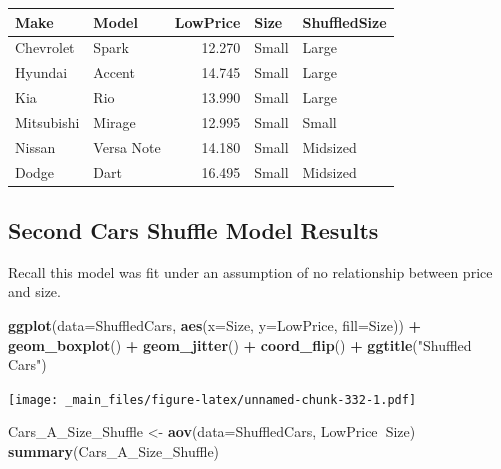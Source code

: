 \documentclass[]{book}
\newenvironment{Shaded}{\begin{snugshade}}{\end{snugshade}}
\newcommand{\KeywordTok}[1]{\textcolor[rgb]{0.13,0.29,0.53}{\textbf{#1}}}
\newcommand{\DataTypeTok}[1]{\textcolor[rgb]{0.13,0.29,0.53}{#1}}
\newcommand{\StringTok}[1]{\textcolor[rgb]{0.31,0.60,0.02}{#1}}
\newcommand{\OperatorTok}[1]{\textcolor[rgb]{0.81,0.36,0.00}{\textbf{#1}}}
\newcommand{\NormalTok}[1]{#1}
\begin{document}
\begin{tabular}{l|l|r|l|l}
\hline
Make & Model & LowPrice & Size & ShuffledSize\\
\hline
Chevrolet & Spark & 12.270 & Small & Large\\
\hline
Hyundai & Accent & 14.745 & Small & Large\\
\hline
Kia & Rio & 13.990 & Small & Large\\
\hline
Mitsubishi & Mirage & 12.995 & Small & Small\\
\hline
Nissan & Versa Note & 14.180 & Small & Midsized\\
\hline
Dodge & Dart & 16.495 & Small & Midsized\\
\hline
\end{tabular}

\subsection{Second Cars Shuffle Model
Results}\label{second-cars-shuffle-model-results-1}

Recall this model was fit under an assumption of no relationship between
price and size.

\begin{Shaded}
\begin{Highlighting}[]
\KeywordTok{ggplot}\NormalTok{(}\DataTypeTok{data=}\NormalTok{ShuffledCars, }\KeywordTok{aes}\NormalTok{(}\DataTypeTok{x=}\NormalTok{Size, }\DataTypeTok{y=}\NormalTok{LowPrice, }\DataTypeTok{fill=}\NormalTok{Size)) }\OperatorTok{+}\StringTok{ }
\StringTok{  }\KeywordTok{geom_boxplot}\NormalTok{() }\OperatorTok{+}\StringTok{ }\KeywordTok{geom_jitter}\NormalTok{() }\OperatorTok{+}\StringTok{ }\KeywordTok{coord_flip}\NormalTok{() }\OperatorTok{+}\StringTok{ }\KeywordTok{ggtitle}\NormalTok{(}\StringTok{"Shuffled Cars"}\NormalTok{)}
\end{Highlighting}
\end{Shaded}

\texttt{[image: \_main\_files/figure-latex/unnamed-chunk-332-1.pdf]}

\begin{Shaded}
\begin{Highlighting}[]
\NormalTok{Cars_A_Size_Shuffle <-}\StringTok{ }\KeywordTok{aov}\NormalTok{(}\DataTypeTok{data=}\NormalTok{ShuffledCars, LowPrice}\OperatorTok{~}\NormalTok{Size)}
\KeywordTok{summary}\NormalTok{(Cars_A_Size_Shuffle)}
\end{Highlighting}
\end{Shaded}
\end{document}
